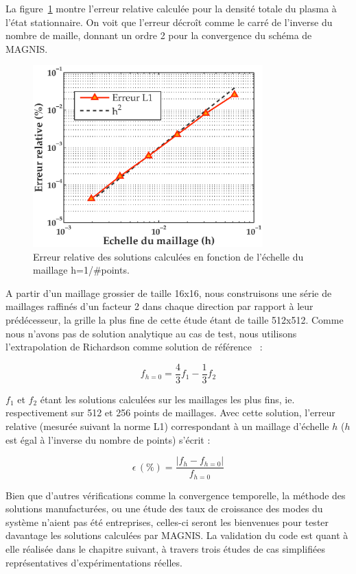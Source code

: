 \begin{refsection}
La figure~\ref{3-convergence} montre l'erreur relative calculée pour la densité
totale du plasma à l'état stationnaire. On voit que l'erreur décroît comme le carré
de l'inverse du nombre de maille, donnant un ordre 2 pour la convergence du
schéma de MAGNIS.

\begin{figure}[htbp]
\centering
\includegraphics[height=70mm]{figures/3-convergence.eps}
{\caption{Erreur relative des solutions calculées en fonction de l'échelle du
maillage h=1/\#points.}
\label{3-convergence}}
\end{figure}

A partir d'un maillage grossier de taille 16x16, nous construisons une série de
maillages raffinés d'un facteur 2 dans chaque
direction par rapport à leur prédécesseur, la grille la
plus fine de cette étude étant de taille 512x512. Comme nous n'avons pas de
solution analytique au cas de test, nous utilisons l'extrapolation de
Richardson comme solution de référence~\parencite{Roache} :

\begin{equation}
f_{h=0}=\frac{4}{3}f_{1}-\frac{1}{3}f_2
\end{equation}

$f_{1}$ et $f_2$ étant les solutions calculées sur les maillages les plus fins,
ie. respectivement sur 512 et 256 points de maillages. Avec cette solution,
l'erreur relative (mesurée suivant la norme L1) correspondant à un maillage
d'échelle $h$ ($h$ est égal à l'inverse du nombre de points) s'écrit :

\begin{equation}
\epsilon\,(\text{\%})=\frac{|f_h-f_{h=0}|}{f_{h=0}}
\end{equation}

Bien que d'autres
vérifications comme la convergence temporelle, la méthode des solutions manufacturées, ou
une étude des taux de croissance des modes du système n'aient pas été
entreprises, celles-ci seront les bienvenues pour tester davantage les
solutions calculées par MAGNIS. La validation du code est quant à elle réalisée
dans le chapitre suivant, à travers trois études de cas simplifiées
représentatives d'expérimentations réelles.



%
%
\end{refsection}


